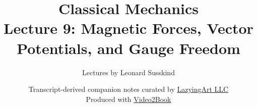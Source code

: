 \documentclass[11pt,oneside]{book}
\begin{document}
\hypersetup{pageanchor=false}
\frontmatter
\title{Classical Mechanics\\[0.45em]
\large Lecture 9: Magnetic Forces, Vector Potentials, and Gauge Freedom}
\author{Lectures by Leonard Susskind}
\date{Transcript-derived companion notes curated by
\href{https://lazying.art}{LazyingArt LLC}\\[0.35em]
\small Produced with
\href{https://github.com/lachlanchen/Video2Book}{Video2Book}}
\maketitle
\hypersetup{pageanchor=true}
\mainmatter

\end{document}
